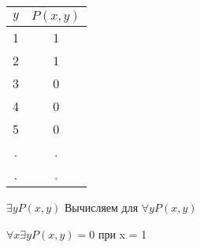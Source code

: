 \documentclass[russian]{lecture-notes}
\begin{document}
\begin{example}
        \begin{table}[h!]
                \centering
                \begin{tabular}{|c|c|}
                    \hline
                    $ y $ & $P(x,y)$ \\ \hline
                    1      & 1       \\ \hline
                    2      & 1       \\ \hline
                    3      & 0       \\ \hline
                    4      & 0       \\ \hline
                    5      & 0       \\ \hline
                    .      & .       \\ \hline
                    .      & .       \\ \hline
                \end{tabular}
            \end{table}

        $\exists y P(x,y)$ Вычисляем для $\forall y P(x,y)$

        $\forall x \exists y P(x,y) = 0$ при x = 1



        \end{example}
\end{document}
